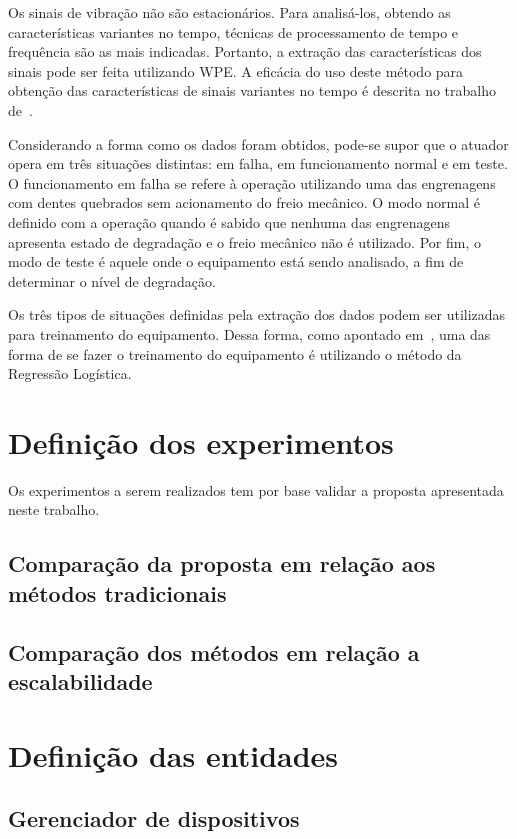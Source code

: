 Os sinais de vibração não são estacionários. Para analisá-los, obtendo as características variantes
no tempo, técnicas de processamento de tempo e frequência são as mais indicadas. Portanto, a
extração das características dos sinais pode ser feita utilizando \gls{WPE}. A eficácia do uso deste
método para obtenção das características de sinais variantes no tempo é descrita no trabalho
de~\cite{qiu2006wavelet}.

Considerando a forma como os dados foram obtidos, pode-se supor que o atuador opera em três
situações distintas: em falha, em funcionamento normal e em teste. O funcionamento em falha se
refere à operação utilizando uma das engrenagens com dentes quebrados sem acionamento do freio
mecânico. O modo normal é definido com a operação quando é sabido que nenhuma das engrenagens
apresenta estado de degradação e o freio mecânico não é utilizado. Por fim, o modo de teste é aquele
onde o equipamento está sendo analisado, a fim de determinar o nível de degradação.

Os três tipos de situações definidas pela extração dos dados podem ser utilizadas para treinamento
do equipamento. Dessa forma, como apontado em~\cite{lazzaretti2012avaliacao}, uma das forma de se
fazer o treinamento do equipamento é utilizando o método da Regressão Logística.

\section{Definição dos experimentos}

Os experimentos a serem realizados tem por base validar a proposta apresentada neste trabalho.


\subsection{Comparação da proposta em relação aos métodos tradicionais}


\subsection{Comparação dos métodos em relação a escalabilidade}


\iffalse
\section{Definição das entidades}


\subsection{Gerenciador de dispositivos}


